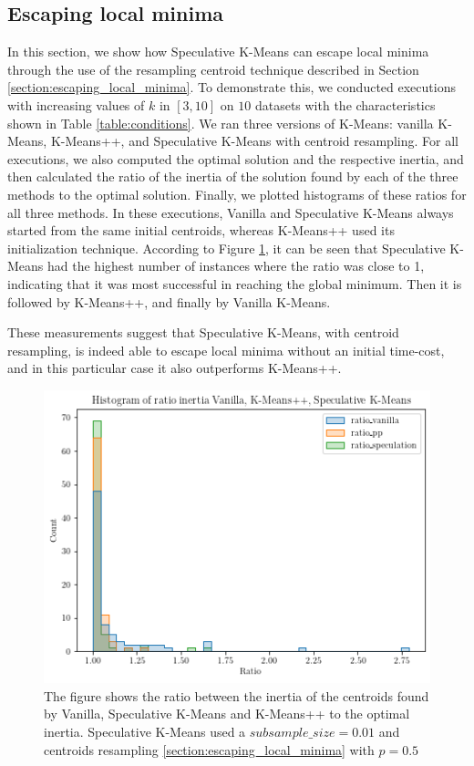 \subsection{Escaping local minima}
\label{section:evaluation_escaping_local_minima}
In this section, we show how Speculative K-Means can escape local minima through the use of the resampling centroid technique described in Section \ref{section:escaping_local_minima}. To demonstrate this, we conducted executions with increasing values of $k$ in $[3,10]$ on $10$ datasets with the characteristics shown in Table \ref{table:conditions}. We ran three versions of K-Means: vanilla K-Means,  K-Means++, and Speculative K-Means with centroid resampling. For all executions, we also computed the optimal solution and the respective inertia, and then calculated the ratio of the inertia of the solution found by each of the three methods to the optimal solution. Finally, we plotted histograms of these ratios for all three methods. In these executions, Vanilla and Speculative K-Means always started from the same initial centroids, whereas K-Means++ used its initialization technique. According to Figure \ref{fig:histogram_escape_local_minima}, it can be seen that Speculative K-Means had the highest number of instances where the ratio was close to 1, indicating that it was most successful in reaching the global minimum. Then it is followed by K-Means++, and finally by Vanilla K-Means.

These measurements suggest that Speculative K-Means, with centroid resampling, is indeed able to escape local minima without an initial time-cost, and in this particular case it also outperforms K-Means++.

\begin{figure}[h]
\centering
\includegraphics[width=\linewidth]{./plots/histogram_escape_local_minima.png}
\caption{The figure shows the ratio between the inertia of the centroids found by Vanilla, Speculative K-Means and K-Means++ to the optimal inertia. Speculative K-Means used a $subsample\_size=0.01$ and centroids resampling \ref{section:escaping_local_minima} with $p=0.5$}
\label{fig:histogram_escape_local_minima}
\end{figure}